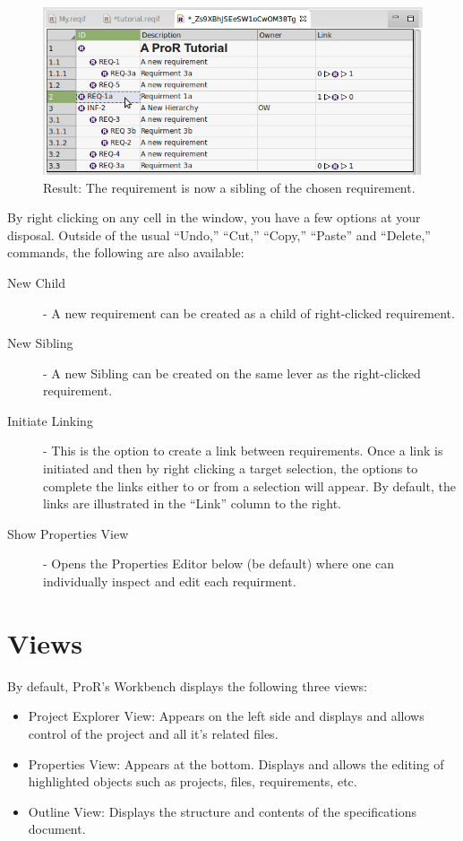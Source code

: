 {{{\begin{figure}[H]
  \centering
  \includegraphics[width=\linewidth]{../rmf-images/hierarchy_step_4.png}
  \caption{Result: The requirement is now a sibling of the chosen requirement.}
  \label{fig:hierarchy_step_4}
\end{figure}

By right clicking on any cell in the window, you have a few options at your disposal. Outside of the usual ``Undo,'' ``Cut,'' ``Copy,'' ``Paste'' and ``Delete,'' commands, the following are also available:

\begin{description}

\item
  [New Child] - A new requirement can be created as a child of right-clicked requirement.
\item
  [New Sibling] - A new Sibling can be created on the same lever as the right-clicked requirement.
\item
  [Initiate Linking] - This is the option to create a link between requirements. Once a link is initiated and then by right clicking a target selection, the options to complete the links either to or from a selection will appear. By default, the links are illustrated in the ``Link'' column to the right. 
\item
  [Show Properties View] - Opens the Properties Editor below (be default) where one can individually inspect and edit each requirment.
\end{description}


\section{Views}

By default, ProR's Workbench displays the following three views:
\begin{itemize}
\item Project Explorer View: Appears on the left side and displays and allows control of the project and all it's related files.
\item Properties View: Appears at the bottom. Displays and allows the editing of highlighted objects such as projects, files, requirements, etc.
\item Outline View: Displays the structure and contents of the specifications document.
\end{itemize}

}}}
